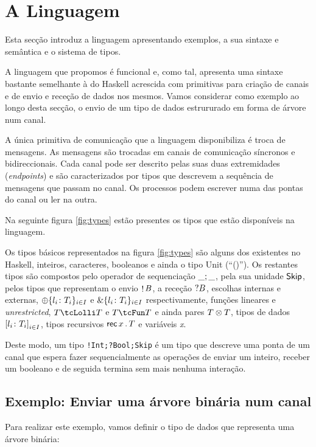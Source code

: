 \section{A Linguagem}
\lstset{language=CFST}
Esta secção introduz a linguagem apresentando exemplos, a sua sintaxe e semântica e o sistema de tipos. 

A linguagem que propomos é funcional e, como tal, apresenta uma sintaxe bastante semelhante à do Haskell acrescida com primitivas para criação de canais e de envio e receção de dados nos mesmos. Vamos considerar como exemplo ao longo desta secção, o envio de um tipo de dados estrururado em forma de árvore num canal.

A única primitiva de comunicação que a linguagem disponibiliza é troca de mensagens. As mensagens são trocadas em canais de comunicação síncronos e bidireccionais. Cada canal pode ser descrito pelas suas duas extremidades (\textit{endpoints}) e são caracterizados por tipos que descrevem a sequência de mensagens que passam no canal.
Os processos podem escrever numa das pontas do canal ou ler na outra.

Na seguinte figura \ref{fig:types} estão presentes os tipos que estão disponíveis na linguagem.



Os tipos básicos representados na figura \ref{fig:types} são alguns dos existentes no Haskell, inteiros, caracteres, booleanos e ainda o tipo Unit (``()''). Os restantes tipos são compostos pelo operador de sequenciação $\_;\_$, pela sua unidade $\mathsf{Skip}$, pelos tipos que representam o envio $\mathop! B$, a receção $?B$, escolhas internas e externas, $\oplus\{l_i\colon T_i\}_{i\in I}$ e $\&\{l_i\colon T_i\}_{i\in I}$ respectivamente, funções lineares e \textit{unrestricted}, $\tLinFun{T}{T}$ e $\tUnFun{T}{T}$ e ainda pares $T\otimes T$, tipos de dados ${[l_i\colon T_i]}_{i\in I}$, tipos recursivos $\mathsf{rec}\,x\,.\,T$ e variáveis \textit{x}.

Deste modo, um tipo \lstinline"!Int;?Bool;Skip" é um tipo que descreve uma ponta de um canal que espera fazer sequencialmente as operações de enviar um inteiro, receber um booleano e de seguida termina sem mais nenhuma interação.

\subsection{Exemplo: Enviar uma árvore binária num canal}
\label{sec:example}
Para realizar este exemplo, vamos definir o tipo de dados que representa uma árvore binária:

